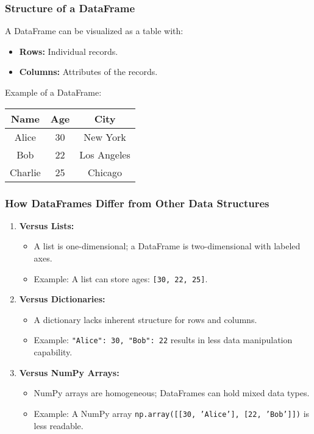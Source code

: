 \documentclass[aspectratio=169]{beamer}
\begin{document}
\begin{frame}[fragile]
    \frametitle{Structure of a DataFrame}
    A DataFrame can be visualized as a table with:
    \begin{itemize}
        \item \textbf{Rows:} Individual records.
        \item \textbf{Columns:} Attributes of the records.
    \end{itemize}
    
    \begin{block}{Example of a DataFrame:}
        \begin{tabular}{|c|c|c|}
            \hline
            \textbf{Name} & \textbf{Age} & \textbf{City} \\
            \hline
            Alice & 30 & New York \\
            \hline
            Bob & 22 & Los Angeles \\
            \hline
            Charlie & 25 & Chicago \\
            \hline
        \end{tabular}
    \end{block}
\end{frame}

\begin{frame}[fragile]
    \frametitle{How DataFrames Differ from Other Data Structures}
    \begin{enumerate}
        \item \textbf{Versus Lists:}
            \begin{itemize}
                \item A list is one-dimensional; a DataFrame is two-dimensional with labeled axes.
                \item Example: A list can store ages: \texttt{[30, 22, 25]}.
            \end{itemize}
        \item \textbf{Versus Dictionaries:}
            \begin{itemize}
                \item A dictionary lacks inherent structure for rows and columns.
                \item Example: \texttt{{"Alice": 30, "Bob": 22}} results in less data manipulation capability.
            \end{itemize}
        \item \textbf{Versus NumPy Arrays:}
            \begin{itemize}
                \item NumPy arrays are homogeneous; DataFrames can hold mixed data types.
                \item Example: A NumPy array \texttt{np.array([[30, 'Alice'], [22, 'Bob']])} is less readable.
            \end{itemize}
    \end{enumerate}
\end{frame}
\end{document}
